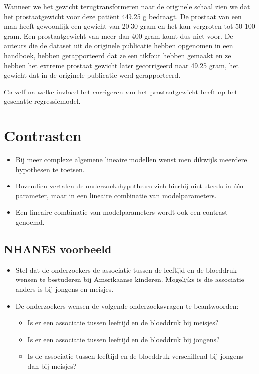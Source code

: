 \documentclass[
  dutch,
  letterpaper,
  12pt]{book}
\providecommand{\tightlist}{%
  \setlength{\itemsep}{0pt}\setlength{\parskip}{0pt}}
\theoremstyle{definition}
\theoremstyle{definition}
\theoremstyle{definition}
\theoremstyle{remark}
\begin{document}
Wanneer we het gewicht terugtransformeren naar de originele schaal zien
we dat het prostaatgewicht voor deze patiënt 449.25 g bedraagt. De
prostaat van een man heeft gewoonlijk een gewicht van 20-30 gram en het
kan vergroten tot 50-100 gram. Een prostaatgewicht van meer dan 400 gram
komt dus niet voor. De auteurs die de dataset uit de originele
publicatie hebben opgenomen in een handboek, hebben gerapporteerd dat ze
een tikfout hebben gemaakt en ze hebben het extreme prostaat gewicht
later gecorrigeerd naar 49.25 gram, het gewicht dat in de originele
publicatie werd gerapporteerd.

Ga zelf na welke invloed het corrigeren van het prostaatgewicht heeft op
het geschatte regressiemodel.

\section{Contrasten}\label{contrasten}

\begin{itemize}
\tightlist
\item
  Bij meer complexe algemene lineaire modellen wenst men dikwijls
  meerdere hypothesen te toetsen.
\item
  Bovendien vertalen de onderzoekshypotheses zich hierbij niet steeds in
  één parameter, maar in een lineaire combinatie van modelparameters.
\item
  Een lineaire combinatie van modelparameters wordt ook een contrast
  genoemd.
\end{itemize}

\subsection{NHANES voorbeeld}\label{nhanes-voorbeeld-1}

\begin{itemize}
\item
  Stel dat de onderzoekers de associatie tussen de leeftijd en de
  bloeddruk wensen te bestuderen bij Amerikaanse kinderen. Mogelijks is
  die associatie anders is bij jongens en meisjes.
\item
  De onderzoekers wensen de volgende onderzoeksvragen te beantwoorden:

  \begin{itemize}
  \tightlist
  \item
    Is er een associatie tussen leeftijd en de bloeddruk bij meisjes?
  \item
    Is er een associatie tussen leeftijd en de bloeddruk bij jongens?
  \item
    Is de associatie tussen leeftijd en de bloeddruk verschillend bij
    jongens dan bij meisjes?
  \end{itemize}
\end{itemize}
\end{document}
